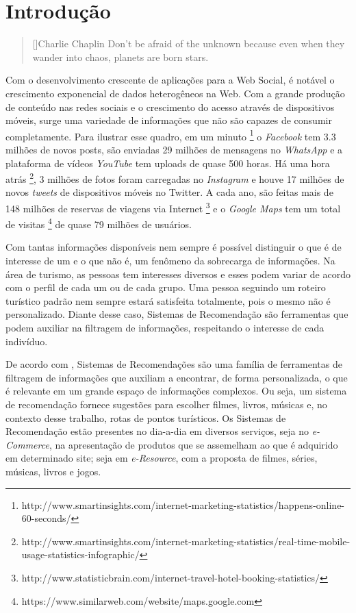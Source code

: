 \chapter{Introdução}
\label{chp:introduction}

\begin{quotation}[]{Charlie Chaplin}
Don't be afraid of the unknown because even when they wander into chaos, planets are born stars.
\end{quotation}

Com o desenvolvimento crescente de aplicações para a Web Social, é notável o crescimento exponencial de dados heterogêneos na Web.
Com a grande produção de conteúdo nas redes sociais e o crescimento do acesso através de dispositivos móveis, surge uma variedade de informações que não são capazes de consumir completamente. Para ilustrar esse quadro, em um minuto \footnote{http://www.smartinsights.com/internet-marketing-statistics/happens-online-60-seconds/} o \textit{Facebook} tem 3.3 milhões de novos posts, são enviadas 29 milhões de mensagens no \textit{WhatsApp} e a plataforma de vídeos \textit{YouTube} tem uploads de quase 500 horas.
Há uma hora atrás \footnote{http://www.smartinsights.com/internet-marketing-statistics/real-time-mobile-usage-statistics-infographic/}, 3 milhões de fotos foram carregadas no \textit{Instagram} e houve 17 milhões de novos \textit{tweets} de dispositivos móveis no Twitter. A cada ano, são feitas mais de 148 milhões de reservas de viagens via Internet \footnote{http://www.statisticbrain.com/internet-travel-hotel-booking-statistics/} e o \textit{Google Maps} tem um total de visitas \footnote{https://www.similarweb.com/website/maps.google.com} de quase 79 milhões de usuários.

Com tantas informações disponíveis nem sempre é possível distinguir o que é de interesse de um e o que não é, um fenômeno da sobrecarga de informações. Na área de turismo, as pessoas tem interesses diversos e esses podem variar de acordo com o perfil de cada um ou de cada grupo. Uma pessoa seguindo um roteiro turístico padrão nem sempre estará satisfeita totalmente, pois o mesmo não é personalizado. Diante desse caso, Sistemas de Recomendação são ferramentas que podem auxiliar na filtragem de informações, respeitando o interesse de cada indivíduo.

De acordo com \cite{DiNoia2015}, Sistemas de Recomendações são uma família de ferramentas de filtragem de informações que auxiliam a encontrar, de forma personalizada, o que é relevante em um grande espaço de informações complexos. Ou seja, um sistema de recomendação fornece sugestões para escolher filmes, livros, músicas e, no contexto desse trabalho, rotas de pontos turísticos. Os Sistemas de Recomendação estão presentes no dia-a-dia em diversos serviços, seja no \textit{e-Commerce}, na apresentação de produtos que se assemelham ao que é  adquirido em determinado site; seja em \textit{e-Resource}, com a proposta de filmes, séries, músicas, livros e jogos.


